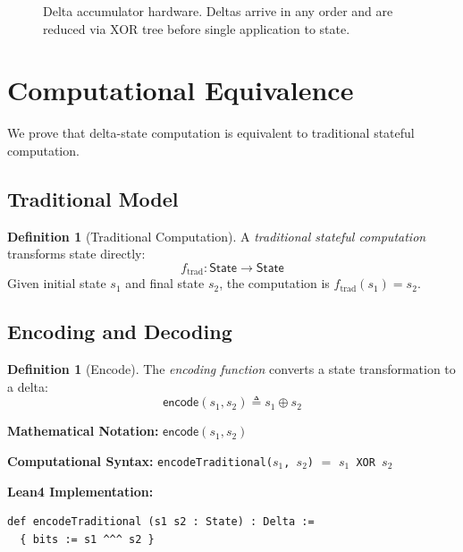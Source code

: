 \documentclass[11pt,letterpaper]{article}
\theoremstyle{plain}
\theoremstyle{definition}
\newtheorem{definition}[theorem]{Definition}
\theoremstyle{remark}
\newcommand{\StateType}{\mathsf{State}}
\begin{document}
\begin{figure}[h]
\centering

\caption{Delta accumulator hardware. Deltas arrive in any order and are reduced via XOR tree before single application to state.}
\label{fig:accumulator}
\end{figure}

\section{Computational Equivalence}
\label{sec:equivalence}

We prove that delta-state computation is equivalent to traditional stateful computation.

\subsection{Traditional Model}

\begin{definition}[Traditional Computation]
\label{def:traditional}
A \emph{traditional stateful computation} transforms state directly:
\[
f_{\text{trad}} : \StateType \to \StateType
\]
Given initial state $s_1$ and final state $s_2$, the computation is $f_{\text{trad}}(s_1) = s_2$.
\end{definition}

\subsection{Encoding and Decoding}

\begin{definition}[Encode]
\label{def:encode}
The \emph{encoding function} converts a state transformation to a delta:
\[
\mathsf{encode}(s_1, s_2) \triangleq s_1 \oplus s_2
\]

\noindent\textbf{Mathematical Notation:} $\mathsf{encode}(s_1, s_2)$

\noindent\textbf{Computational Syntax:} \texttt{encodeTraditional($s_1$, $s_2$)} $=$ \texttt{$s_1$ XOR $s_2$}

\medskip
\noindent\textbf{Lean4 Implementation:}
\begin{lstlisting}
def encodeTraditional (s1 s2 : State) : Delta :=
  { bits := s1 ^^^ s2 }
\end{lstlisting}
\end{definition}
\end{document}
